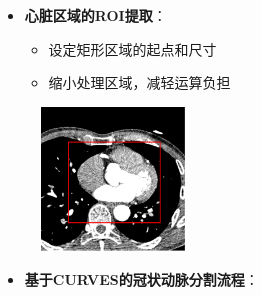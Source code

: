 \begin{frame}
\begin{itemize}
  \item \textbf{心脏区域的ROI提取}：
  \begin{itemize}
  \pause \item 设定矩形区域的起点和尺寸
  \pause \item 缩小处理区域，减轻运算负担
  \end{itemize}
\end{itemize}
\begin{figure}[t]
\centering
\includegraphics[width=1.5in]{../../Figures/coronary/ROI_Extraction}
\end{figure}
\end{frame}

\begin{frame}
\begin{itemize}
  \item \textbf{基于CURVES的冠状动脉分割流程}：
\end{itemize}
\begin{figure}[t]
\centering

\end{figure}
\end{frame}

